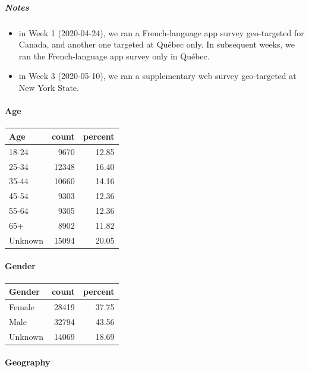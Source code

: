 \documentclass[
]{article}
\providecommand{\tightlist}{%
  \setlength{\itemsep}{0pt}\setlength{\parskip}{0pt}}
\begin{document}
\hypertarget{notes}{%
\subparagraph{Notes}\label{notes}}

\begin{itemize}
\tightlist
\item
  in Week 1 (2020-04-24), we ran a French-language app survey
  geo-targeted for Canada, and another one targeted at Québec only. In
  subsequent weeks, we ran the French-language app survey only in
  Québec.
\item
  in Week 3 (2020-05-10), we ran a supplementary web survey geo-targeted
  at New York State.
\end{itemize}

\hypertarget{age}{%
\paragraph{Age}\label{age}}

\begin{longtable}[]{@{}lrr@{}}
\toprule
Age & count & percent \\
\midrule
\endhead
18-24 & 9670 & 12.85 \\
25-34 & 12348 & 16.40 \\
35-44 & 10660 & 14.16 \\
45-54 & 9303 & 12.36 \\
55-64 & 9305 & 12.36 \\
65+ & 8902 & 11.82 \\
Unknown & 15094 & 20.05 \\
\bottomrule
\end{longtable}

\hypertarget{gender}{%
\paragraph{Gender}\label{gender}}

\begin{longtable}[]{@{}lrr@{}}
\toprule
Gender & count & percent \\
\midrule
\endhead
Female & 28419 & 37.75 \\
Male & 32794 & 43.56 \\
Unknown & 14069 & 18.69 \\
\bottomrule
\end{longtable}

\hypertarget{geography}{%
\paragraph{Geography}\label{geography}}
\end{document}
